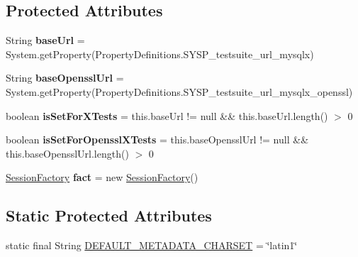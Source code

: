 \subsection*{Protected Attributes}
\begin{DoxyCompactItemize}
\item 
\mbox{\label{classtestsuite_1_1x_1_1internal_1_1_internal_x_base_test_case_a0b0042b5d1e1bf1b7124abebff0396e5}} 
String {\bfseries base\+Url} = System.\+get\+Property(Property\+Definitions.\+S\+Y\+S\+P\+\_\+testsuite\+\_\+url\+\_\+mysqlx)
\item 
\mbox{\label{classtestsuite_1_1x_1_1internal_1_1_internal_x_base_test_case_a6800502ed8f094f86e89e40a50c3da68}} 
String {\bfseries base\+Openssl\+Url} = System.\+get\+Property(Property\+Definitions.\+S\+Y\+S\+P\+\_\+testsuite\+\_\+url\+\_\+mysqlx\+\_\+openssl)
\item 
\mbox{\label{classtestsuite_1_1x_1_1internal_1_1_internal_x_base_test_case_abca8c335af0756fa3a8b63a2a4a5fcaa}} 
boolean {\bfseries is\+Set\+For\+X\+Tests} = this.\+base\+Url != null \&\& this.\+base\+Url.\+length() $>$ 0
\item 
\mbox{\label{classtestsuite_1_1x_1_1internal_1_1_internal_x_base_test_case_a3f6e258d51d6cfd6639dea9404841846}} 
boolean {\bfseries is\+Set\+For\+Openssl\+X\+Tests} = this.\+base\+Openssl\+Url != null \&\& this.\+base\+Openssl\+Url.\+length() $>$ 0
\item 
\mbox{\label{classtestsuite_1_1x_1_1internal_1_1_internal_x_base_test_case_aea4eb1d251b560a5be0d14fe49e15e29}} 
\mbox{\hyperlink{classcom_1_1mysql_1_1cj_1_1xdevapi_1_1_session_factory}{Session\+Factory}} {\bfseries fact} = new \mbox{\hyperlink{classcom_1_1mysql_1_1cj_1_1xdevapi_1_1_session_factory}{Session\+Factory}}()
\end{DoxyCompactItemize}
\subsection*{Static Protected Attributes}
\begin{DoxyCompactItemize}
\item 
static final String \mbox{\hyperlink{classtestsuite_1_1x_1_1internal_1_1_internal_x_base_test_case_a9bec716304323fdf5e6ecd55827e7c01}{D\+E\+F\+A\+U\+L\+T\+\_\+\+M\+E\+T\+A\+D\+A\+T\+A\+\_\+\+C\+H\+A\+R\+S\+ET}} = \char`\"{}latin1\char`\"{}
\end{DoxyCompactItemize}


